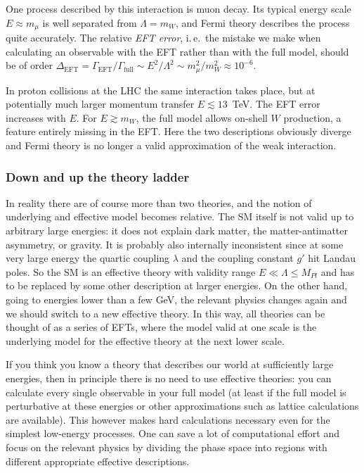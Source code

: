 One process described by this interaction is muon decay. Its typical
energy scale $E \approx m_\mu$ is well separated from $\Lambda = m_W$,
and Fermi theory describes the process quite accurately. The relative
\emph{EFT error}, i.\,e.\ the mistake we make when calculating an
observable with the EFT rather than with the full model, should be of
order
$\Delta_\text{EFT} = \Gamma_\text{EFT} / \Gamma_\text{full} \sim E^2 /
\Lambda^2 \sim m_\mu^2 / m_W^2 \approx 10^{-6}$.

In proton collisions at the LHC the same interaction takes place, but
at potentially much larger momentum transfer $E \lesssim 13$~TeV. The
EFT error increases with $E$. For $E \gtrsim m_W$, the full model
allows on-shell $W$ production, a feature entirely missing in the
EFT. Here the two descriptions obviously diverge and Fermi theory is
no longer a valid approximation of the weak interaction.



\subsubsection{Down and up the theory ladder}

In reality there are of course more than two theories, and the notion
of underlying and effective model becomes relative. The SM itself is
not valid up to arbitrary large energies: it does not explain dark
matter, the matter-antimatter asymmetry, or gravity. It is probably
also internally inconsistent since at some very large energy the
quartic coupling $\lambda$ and the coupling constant $g'$ hit Landau
poles. So the SM is an effective theory with validity range
$E \ll \Lambda \le M_{Pl}$ and has to be replaced by some other
description at larger energies. On the other hand, going to energies
lower than a few GeV, the relevant physics changes again and we should
switch to a new effective theory. In this way, all theories can be
thought of as a series of EFTs, where the model valid at one scale is
the underlying model for the effective theory at the next lower scale.

If you think you know a theory that describes our world at
sufficiently large energies, then in principle there is no need to use
effective theories: you can calculate every single observable in your
full model (at least if the full model is perturbative at these
energies or other approximations such as lattice calculations are
available). This however makes hard calculations necessary even
for the simplest low-energy processes. One can save a lot of
computational effort and focus on the relevant physics by dividing the
phase space into regions with different appropriate effective
descriptions.

